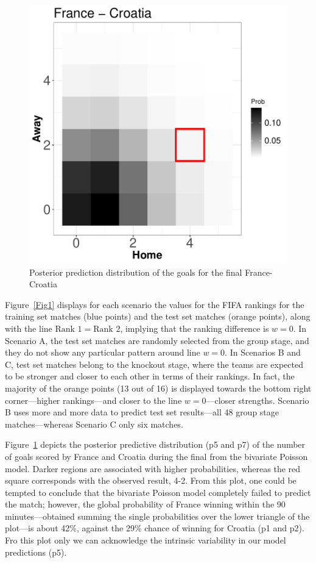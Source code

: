 \documentclass{statsoc}
\begin{document}
%
\begin{figure}
\centering
\includegraphics[scale=0.5]{France-CroatiaHeatmap_bivpois}
\caption{Posterior prediction distribution of the goals for the final France-Croatia}
\label{Fig2}
\end{figure}
%
Figure~\ref{Fig1} displays for each scenario the values for the FIFA rankings for the training set matches (blue points) and the test set matches (orange points), along with the 
line $\text{Rank }1= \text{Rank }2$, implying that the ranking difference is $w=0$. In Scenario A, the test set matches are randomly selected from the group stage, and they do not 
show any particular pattern around  line $w=0$. In Scenarios B and C, test set matches belong to the knockout stage, where the teams are expected to be stronger and 
closer to each other in terms of their rankings. In fact, the majority of the orange points (13 out of 16) is displayed towards the bottom right corner---higher rankings---and closer to the line $w=0$---closer strengths. Scenario B uses more and more data to predict test set results---all  48 group stage matches---whereas Scenario C only six matches.

Figure~\ref{Fig2} depicts the posterior predictive distribution (p5 and p7) of the number of goals scored by France and Croatia during the final from the bivariate Poisson model. Darker 
regions are associated with higher probabilities, whereas the red square  corresponds with the observed result, 4-2. From this plot, one could be tempted to 
conclude that the bivariate Poisson model completely failed to predict the match; however, the global probability of France winning within the 90 minutes---obtained summing the single probabilities over the lower triangle of the plot---is about 42\%, against the 29\% chance of winning for Croatia (p1 and p2). Fro this plot only we can acknowledge the intrinsic variability in our model predictions (p5).
\end{document}
